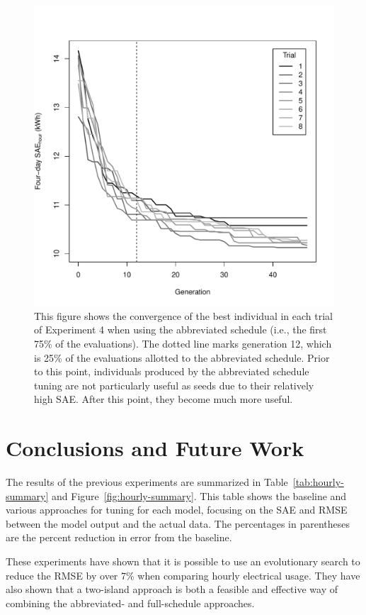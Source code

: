\documentclass[preprint, review, 12pt]{elsarticle}
\begin{document}
\begin{figure}[htbp]
\centering
\includegraphics[width=5in]{figure2}
\caption{This figure shows the convergence of the best individual in each trial of Experiment 4 when using the abbreviated schedule (i.e., the first 75\% of the evaluations). The dotted line marks generation 12, which is 25\% of the evaluations allotted to the abbreviated schedule. Prior to this point, individuals produced by the abbreviated schedule tuning are not particularly useful as seeds due to their relatively high SAE. After this point, they become much more useful.}
\label{fig:hour-converge}
\end{figure}


\section{Conclusions and Future Work}
\label{sec:conclusions}
The results of the previous experiments are summarized in Table~\ref{tab:hourly-summary} and Figure~\ref{fig:hourly-summary}. This table shows the baseline and various approaches for tuning for each model, focusing on the SAE and RMSE between the model output and the actual data. The percentages in parentheses are the percent reduction in error from the baseline.

These experiments have shown that it is possible to use an evolutionary search to reduce the RMSE by over 7\% when comparing hourly electrical usage. They have also shown that a two-island approach is both a feasible and effective way of combining the abbreviated- and full-schedule approaches. 
\end{document}
